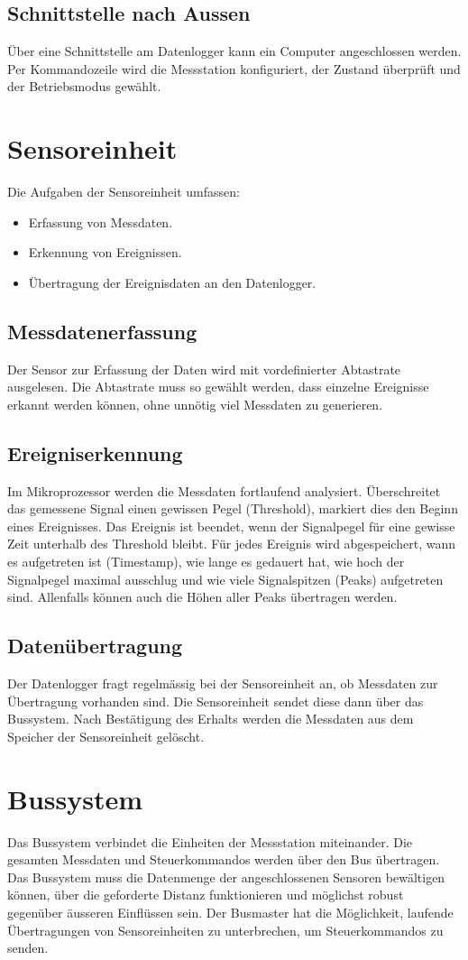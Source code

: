 \subsection{Schnittstelle nach Aussen}
Über eine Schnittstelle am Datenlogger kann ein Computer angeschlossen werden. Per Kommandozeile wird die Messstation konfiguriert, der Zustand überprüft und der Betriebsmodus gewählt.


\section{Sensoreinheit}
Die Aufgaben der Sensoreinheit umfassen:
\begin{itemize}
\item Erfassung von Messdaten.
\item Erkennung von Ereignissen.
\item Übertragung der Ereignisdaten an den Datenlogger.
\end{itemize}

\subsection{Messdatenerfassung}
Der Sensor zur Erfassung der Daten wird mit vordefinierter Abtastrate ausgelesen. Die Abtastrate muss so gewählt werden, dass einzelne Ereignisse erkannt werden können, ohne unnötig viel Messdaten zu generieren.

\subsection{Ereigniserkennung}
Im Mikroprozessor werden die Messdaten fortlaufend analysiert. Überschreitet das gemessene Signal einen gewissen Pegel (Threshold), markiert dies den Beginn eines Ereignisses. Das Ereignis ist beendet, wenn der Signalpegel für eine gewisse Zeit unterhalb des Threshold bleibt. Für jedes Ereignis wird abgespeichert, wann es aufgetreten ist (Timestamp), wie lange es gedauert hat, wie hoch der Signalpegel maximal ausschlug und wie viele Signalspitzen (Peaks) aufgetreten sind. Allenfalls können auch die Höhen aller Peaks übertragen werden.

\subsection{Datenübertragung}
Der Datenlogger fragt regelmässig bei der Sensoreinheit an, ob Messdaten zur Übertragung vorhanden sind. Die Sensoreinheit sendet diese dann über das Bussystem. Nach Bestätigung des Erhalts werden die Messdaten aus dem Speicher der Sensoreinheit gelöscht.

\section{Bussystem}
Das Bussystem verbindet die Einheiten der Messstation miteinander. Die gesamten Messdaten und Steuerkommandos werden über den Bus übertragen. Das Bussystem muss die Datenmenge der angeschlossenen Sensoren bewältigen können, über die geforderte Distanz funktionieren und möglichst robust gegenüber äusseren Einflüssen sein. Der Busmaster hat die Möglichkeit, laufende Übertragungen von Sensoreinheiten zu unterbrechen, um Steuerkommandos zu senden.
